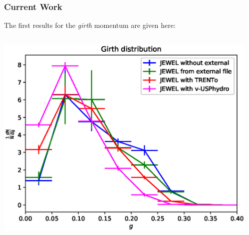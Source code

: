 \documentclass{beamer}
\begin{document}
\begin{frame}\frametitle{Current Work}
	\begin{minipage}{1\textwidth}
	The first results for the \emph{girth} momentum are given here:
    \end{minipage}
    \begin{columns}
    \begin{column}{0.5\textwidth}
	\begin{minipage}[l]{0.5\textwidth}
	\includegraphics[scale=0.4]{images/Angularity.eps}
	\end{minipage}
	\end{column}
    \begin{column}{0.4\textwidth}
	\begin{minipage}[r]{1\textwidth}
	
	\end{minipage}
	\end{column}
	\end{columns}
\end{frame}
\end{document}
